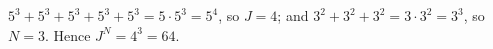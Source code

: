 $5^3+5^3+5^3+5^3+5^3=5\cdot5^3=5^4$, so $J=4$; and $3^2+3^2+3^2=3\cdot3^2=3^3$, so $N=3$. Hence $J^N=4^3=\boxed{64}$.
